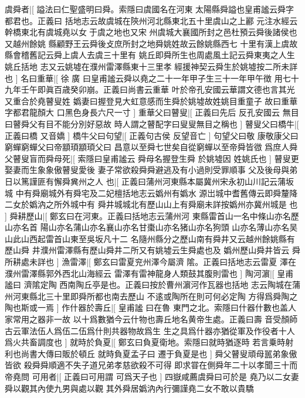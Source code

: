 虞舜者|[%
謚法曰仁聖盛明曰舜。索隱曰虞國名在河東%
太陽縣舜謚也皇甫謐云舜字都君也。正義曰%
%
括地志云故虞城在陝州河北縣東北五十里虞山之上酈%
元注水經云幹橋東北有虞城堯以女𡣕于虞之地也又宋%
%
州虞城大襄國所封之邑杜預云舜後諸侯也又越州餘姚%
縣顧野王云舜後攴庶所封之地舜姚姓故云餘姚縣西七%
%
十里有漢上虞故縣會稽舊記云舜上虞人去虞三十里有%
姚丘即舜所生也周處風土記云舜東夷之人生姚丘括地%
%
志又云姚墟在濮州雷澤縣東十三里孝%
經援神契云舜生於姚墟按二所未詳也%
]%
名曰重華|[%
徐%
廣%
%
曰皇甫謐云舜以堯之二十一年甲子生三十一年甲午徴%
用七十九年壬午即眞百歳癸卯崩。正義曰尚書云重華%
%
叶於帝孔安國云華謂文德也言其光又重合於堯瞽叟姓%
嬀妻曰握登見大虹意感而生舜於姚墟故姓姚目重童子%
%
故曰重華字都君龍顏大%
口黑色身長六尺一寸%
]%
重華父曰瞽叟|[%
正義曰先后%
反孔安國云%
%
無目曰瞽舜父有目不能分別好惡故%
時人謂之瞽配字曰叟叟無目之稱也%
]%
瞽叟父曰橋牛|[%
正義曰橋%
又音嬌%
]%
橋牛父曰句望|[%
正義句古侯%
反望音亡%
]%
句望父曰敬%
康敬康父曰窮蟬窮蟬父曰帝顓頊顓頊父曰%
昌意以至舜七世矣自從窮蟬以至帝舜皆㣲%
爲庶人舜父瞽叟盲而舜母死|[%
索隱曰皇甫謐云%
舜母名握登生舜%
%
於姚墟因%
姓姚氏也%
]%
瞽叟更娶妻而生象象傲瞽叟愛後%
妻子常欲殺舜舜避逃及有小過則受罪順事%
父及後母與弟日以篤謹匪有懈舜兾州之人%
也|[%
正義曰蒲州河東縣本屬冀州宋永初山川記云蒲坂城%
中有舜廟城外有舜宅及二妃檀括地志云嬀州有嬀水%
%
源岀城中耆舊傳云即舜釐降二女於嬀汭之所外城中有%
舜井城城北有歷山山上有舜廟未詳按嬀州亦冀州城是%
%
也%
%
]%
舜耕歷山|[%
鄭玄曰在河東。正義曰括地志云蒲州河%
東縣雷首山一名中條山亦名歷山亦名首%
%
陽山亦名蒲山亦名襄山亦名甘棗山亦名猪山亦名狗頭%
山亦名薄山亦名吴山此山西起雷首山東至吳坂凡十二%
%
名隨州縣分之歷山南有舜井又云越州餘姚縣有歷山舜%
井濮州雷澤縣有歷山舜井二所又有姚墟云生舜處也及%
%
嬀州歷山舜井皆云%
舜所耕處未詳也%
]%
漁雷澤|[%
鄭玄曰雷夏兖州澤今屬濟%
隂。正義曰括地志云雷夏%
%
澤在濮州雷澤縣郭外西北山海經云%
雷澤有雷神龍身人類鼓其腹則雷也%
]%
陶河濵|[%
皇甫謐曰%
濟隂定陶%
%
西南陶丘亭是也。正義曰按於曹州濵河作瓦器也括地%
志云陶城在蒲州河東縣北三十里即舜所都也南去歷山%
%
不逺或陶所在則可何必定陶%
方得爲舜陶之陶也斯或一焉%
]%
作什器於壽丘|[%
皇甫謐%
曰在魯%
%
東門之北。索隱曰什器什數也盖人家常用之器非一故%
以十爲數猶今云什物也壽丘地名黄帝生處。正義曰壽%
%
音受顏師古云軍法伍人爲伍二伍爲什則共器物故爲生%
生之具爲什器亦猶從軍及作役者十人爲火共畜調度也%
]%
就時於負夏|[%
鄭玄曰負夏衛地。索隱曰就時猶逐時%
若言乗時射利也尚書大傳曰販於頓丘%
%
就時負夏孟子曰%
遷于負夏是也%
]%
舜父瞽叟頑母嚚弟象傲皆欲%
殺舜舜順適不失子道兄弟孝慈欲殺不可得%
即求甞在側舜年二十以孝聞三十而帝堯問%
可用者|[%
正義曰可用謂%
可爲天子也%
]%
四嶽咸薦虞舜曰可於是%
堯乃以二女妻舜以觀其內使九男與處以觀%
其外舜居嬀汭內行彌謹堯二女不敢以貴驕%
